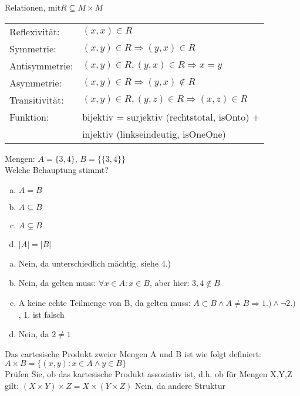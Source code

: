 \begin{card}
	Relationen, mit$R \subseteq M \times M$\\
	\begin{tabular}{ll}
		Reflexivität:& $(x, x) \in R $\\
		Symmetrie:&	$(x, y) \in R \Rightarrow (y, x) \in R$\\
		Antisymmetrie:& $(x, y) \in R, (y, x) \in R \Rightarrow x=y$\\
		Asymmetrie:& $(x, y) \in R \Rightarrow (y, x) \notin R$\\
		Transitivität:& $(x, y) \in R, (y, z) \in R \Rightarrow (x, z) \in R$\\
		Funktion: & bijektiv = surjektiv (rechtstotal, isOnto) +\\
	     	      & injektiv (linkseindeutig, isOneOne)
		\end{tabular}
\end{card}

\begin{card}
	Mengen: $A = \{3, 4\}$, $B = \{\{3, 4\}\}$\\Welche Behauptung stimmt?
	\begin{enumerate}[a)]
	\item $A = B$
	\item $A \subseteq B$
	\item $A \subsetneq B$
	\item $|A| = |B|$
	\end{enumerate}
	\hr
	\begin{enumerate}[a)]
	\item Nein, da unterschiedlich mächtig. siehe 4.)
	\item Nein, da gelten muss: $\forall x \in A: x \in B$, aber hier: $3,4 \notin B$ 
	\item A keine echte Teilmenge von B, da gelten muss: $A \subset B \land A \neq B \Rightarrow 1.) \land \lnot 2.)$ , 1. ist falsch
	\item Nein, da $2 \neq 1$
	\end{enumerate}
\end{card}

\begin{card}
	Das cartesische Produkt zweier Mengen A und B ist wie folgt definiert:
	$A \times B = \{(x,y):x	\in	A \land	y \in B\}$\\
	Prüfen Sie, ob das kartesische Produkt assoziativ ist, d.h. ob für Mengen X,Y,Z gilt:
	$(X	\times Y)\times Z=X \times(Y \times Z)$
	\hr
	Nein, da andere Struktur
\end{card}

